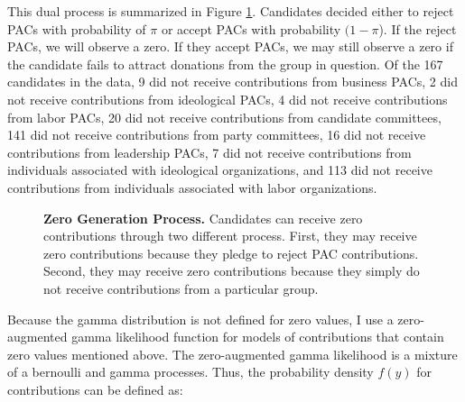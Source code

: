 \documentclass[12pt]{article}
\begin{document}
This dual process is summarized in Figure \ref{fig: zeros}. Candidates decided either to reject PACs with probability of $\pi$ or accept PACs with probability $(1 - \pi$). If the reject PACs, we will observe a zero. If they accept PACs, we may still observe a zero if the candidate fails to attract donations from the group in question. Of the 167 candidates in the data, 9 did not receive contributions from business PACs, 2 did not receive contributions from ideological PACs, 4 did not receive contributions from labor PACs, 20 did not receive contributions from candidate committees, 141 did not receive contributions from party committees, 16 did not receive contributions from leadership PACs, 7 did not receive contributions from individuals associated with ideological organizations, and 113 did not receive contributions from individuals associated with labor organizations. 

\begin{figure}[ht]
	\centering
	\caption{\textbf{Zero Generation Process.} Candidates can receive zero contributions through two different process. First, they may receive zero contributions because they pledge to reject PAC contributions. Second, they may receive zero contributions because they simply do not receive contributions from a particular group.}
	\label{fig: zeros}
\end{figure}


Because the gamma distribution is not defined for zero values, I use a zero-augmented gamma likelihood function for models of contributions that contain zero values mentioned above. The zero-augmented gamma likelihood is a mixture of a bernoulli and gamma processes. Thus, the probability density $f(y)$ for contributions can be defined as:    
\end{document}
